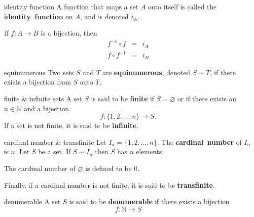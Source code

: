 \documentclass[avery5371,grid]{flashcards}
\newcommand{\N}{\mathbb{N}}
\begin{document}
\begin{flashcard}[Definition]{identity function}
A function that maps a set $A$ onto itself is called the
\mbox{\textbf{identity function}} on $A$, and is denoted $i_{A}$.

\medskip
If $f: A \rightarrow B$ is a bijection, then
\begin{eqnarray*}
f^{-1} \circ f &=& i_{A} \\
f \circ f^{-1} &=& i_{B}
\end{eqnarray*}
\end{flashcard}


\begin{flashcard}[Definition]{equinumerous}
Two sets $S$ and $T$ are \mbox{\textbf{equinumerous}}, denoted
$S \sim T$, if there exists a bijection from $S$ onto $T$.
\end{flashcard}

\begin{flashcard}[Definition]{finite \& infinite sets}
A set $S$ is said to be \textbf{finite} if $S = \varnothing$ or if
there exists an $n \in \N$ and a bijection
\begin{equation*}
f: \{1,2,\ldots,n\} \rightarrow S.
\end{equation*}
If a set is not finite, it is said to be \textbf{infinite}.
\end{flashcard}

\begin{flashcard}[Definition]{cardinal number \& transfinite}
Let $I_{n} = \{1,2,\ldots ,n \}$.  The \mbox{\textbf{cardinal number}}
of $I_{n}$ is $n$.  Let $S$ be a set.  If $S \sim I_{n}$ then
$S$ has $n$ elements.

\bigskip
The cardinal number of $\varnothing$ is defined to be $0$.

\bigskip
Finally, if a cardinal number is not finite, it is said to be
\mbox{\textbf{transfinite}}.
\end{flashcard}

\begin{flashcard}[Definition]{denumerable}
A set $S$ is said to be \textbf{denumerable} if there exists a
bijection
\begin{equation*}
f: \N \rightarrow S
\end{equation*}
\end{flashcard}
\end{document}
